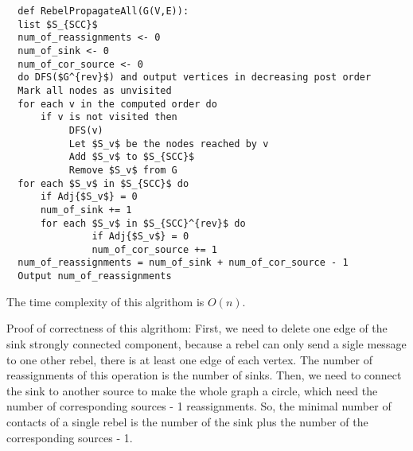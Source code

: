 \documentclass[12pt,a4paper]{article}
\begin{document}
\begin{lstlisting}
  def RebelPropagateAll(G(V,E)):
  list $S_{SCC}$
  num_of_reassignments <- 0
  num_of_sink <- 0
  num_of_cor_source <- 0
  do DFS($G^{rev}$) and output vertices in decreasing post order
  Mark all nodes as unvisited
  for each v in the computed order do
      if v is not visited then 
           DFS(v)
           Let $S_v$ be the nodes reached by v
           Add $S_v$ to $S_{SCC}$
           Remove $S_v$ from G
  for each $S_v$ in $S_{SCC}$ do
      if Adj{$S_v$} = 0
      num_of_sink += 1
      for each $S_v$ in $S_{SCC}^{rev}$ do
               if Adj{$S_v$} = 0
               num_of_cor_source += 1
  num_of_reassignments = num_of_sink + num_of_cor_source - 1
  Output num_of_reassignments        
\end{lstlisting}

The time complexity of this algrithom is $O(n)$.

Proof of correctness of this algrithom:
First, we need to delete one edge of the sink strongly connected component, because a rebel can only send a sigle message to one other rebel, there is at least one edge of each vertex. The number of reassignments of this operation is the number of sinks.
Then, we need to connect the sink to another source to make the whole graph a circle, which need the number of corresponding sources - 1 reassignments. So, the minimal number of contacts of a single rebel is the number of the sink plus the number of the corresponding sources - 1.
\end{document}
